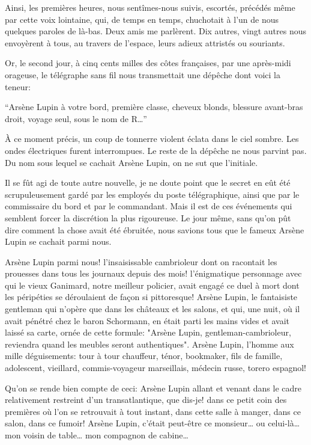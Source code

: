 \documentclass[12pt,a4paper]{article}
\begin{document}
Ainsi, les premières heures, nous sentîmes-nous suivis, escortés, précédés même par cette voix lointaine, qui, de temps en temps, chuchotait à l’un de nous quelques paroles de là-bas. Deux amis me parlèrent. Dix autres, vingt autres nous envoyèrent à tous, au travers de l’espace, leurs adieux attristés ou souriants.

Or, le second jour, à cinq cents milles des côtes françaises, par une après-midi orageuse, le télégraphe sans fil nous transmettait une dépêche dont voici la teneur:

\enquote{Arsène Lupin à votre bord, première classe, cheveux blonds, blessure avant-bras droit, voyage seul, sous le nom de R…}

À ce moment précis, un coup de tonnerre violent éclata dans le ciel sombre. Les ondes électriques furent interrompues. Le reste de la dépêche ne nous parvint pas. Du nom sous lequel se cachait Arsène Lupin, on ne sut que l’initiale.

Il se fût agi de toute autre nouvelle, je ne doute point que le secret en eût été scrupuleusement gardé par les employés du poste télégraphique, ainsi que par le commissaire du bord et par le commandant. Mais il est de ces événements qui semblent forcer la discrétion la plus rigoureuse. Le jour même, sans qu’on pût dire comment la chose avait été ébruitée, nous savions tous que le fameux Arsène Lupin se cachait parmi nous.

Arsène Lupin parmi nous! l’insaisissable cambrioleur dont on racontait les prouesses dans tous les journaux depuis des mois! l’énigmatique personnage avec qui le vieux Ganimard, notre meilleur policier, avait engagé ce duel à mort dont les péripéties se déroulaient de façon si pittoresque! Arsène Lupin, le fantaisiste gentleman qui n’opère que dans les châteaux et les salons, et qui, une nuit, où il avait pénétré chez le baron Schormann, en était parti les mains vides et avait laissé sa carte, ornée de cette formule: "Arsène Lupin, gentleman-cambrioleur, reviendra quand les meubles seront authentiques". Arsène Lupin, l’homme aux mille déguisements: tour à tour chauffeur, ténor, bookmaker, fils de famille, adolescent, vieillard, commis-voyageur marseillais, médecin russe, torero espagnol!

Qu’on se rende bien compte de ceci: Arsène Lupin allant et venant dans le cadre relativement restreint d’un transatlantique, que dis-je! dans ce petit coin des premières où l’on se retrouvait à tout instant, dans cette salle à manger, dans ce salon, dans ce fumoir! Arsène Lupin, c’était peut-être ce monsieur… ou celui-là… mon voisin de table… mon compagnon de cabine…
\end{document}
